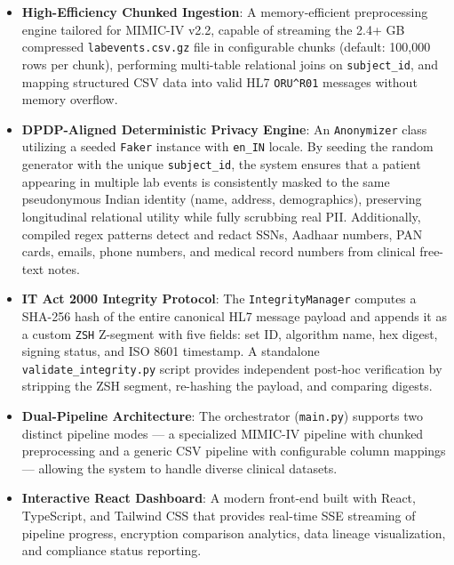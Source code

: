 \documentclass[12pt,a4paper]{report}
\begin{document}
\begin{itemize}
    \item \textbf{High-Efficiency Chunked Ingestion}: A memory-efficient preprocessing
    engine tailored for MIMIC-IV v2.2, capable of streaming the 2.4+ GB compressed
    \texttt{labevents.csv.gz} file in configurable chunks (default: 100,000 rows per
    chunk), performing multi-table relational joins on \texttt{subject\_id}, and mapping
    structured CSV data into valid HL7 \texttt{ORU\string^R01} messages without memory
    overflow.

    \item \textbf{DPDP-Aligned Deterministic Privacy Engine}: An \texttt{Anonymizer}
    class utilizing a seeded \texttt{Faker} instance with \texttt{en\_IN} locale. By
    seeding the random generator with the unique \texttt{subject\_id}, the system
    ensures that a patient appearing in multiple lab events is consistently masked to
    the same pseudonymous Indian identity (name, address, demographics), preserving
    longitudinal relational utility while fully scrubbing real PII. Additionally,
    compiled regex patterns detect and redact SSNs, Aadhaar numbers, PAN cards,
    emails, phone numbers, and medical record numbers from clinical free-text notes.

    \item \textbf{IT Act 2000 Integrity Protocol}: The \texttt{IntegrityManager}
    computes a SHA-256 hash of the entire canonical HL7 message payload and appends
    it as a custom \texttt{ZSH} Z-segment with five fields: set ID, algorithm name,
    hex digest, signing status, and ISO 8601 timestamp. A standalone
    \texttt{validate\_integrity.py} script provides independent post-hoc verification
    by stripping the ZSH segment, re-hashing the payload, and comparing digests.

    \item \textbf{Dual-Pipeline Architecture}: The orchestrator (\texttt{main.py})
    supports two distinct pipeline modes --- a specialized MIMIC-IV pipeline with
    chunked preprocessing and a generic CSV pipeline with configurable column
    mappings --- allowing the system to handle diverse clinical datasets.

    \item \textbf{Interactive React Dashboard}: A modern front-end built with React,
    TypeScript, and Tailwind CSS that provides real-time SSE streaming of pipeline
    progress, encryption comparison analytics, data lineage visualization, and
    compliance status reporting.
\end{itemize}
\end{document}
